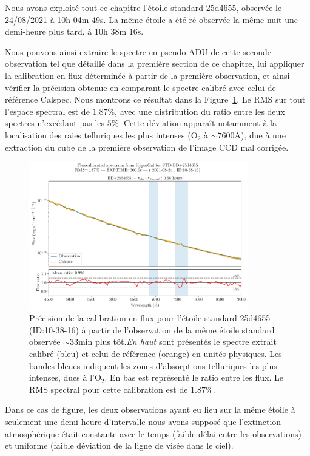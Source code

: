 \documentclass[../main/main.tex]{subfiles}
\begin{document}
Nous avons exploité tout ce chapitre l'étoile standard 25d4655, observée
le 24/08/2021 à 10h 04m 49s. La même étoile a été ré-observée la même
nuit une demi-heure plus tard, à 10h 38m 16s.

Nous pouvons ainsi extraire le spectre en pseudo-ADU de cette seconde
observation tel que détaillé dans la première section de ce chapitre,
lui appliquer la calibration en flux déterminée à partir de la première
observation, et ainsi vérifier la précision obtenue en comparant le
spectre calibré avec celui de référence Calspec.
Nous montrons ce résultat dans la Figure~\ref{fig:fluxcalstd}.
Le RMS sur tout l'espace spectral est de $1.87\%$, avec une distribution
du ratio entre les deux spectres n'excédant pas les $5\%$. Cette
déviation apparaît notamment à la localisation des raies telluriques les
plus intenses (O$_{2}$ à $\sim7600$\AA), due à une extraction du cube de
la première observation de l'image CCD mal corrigée.

\begin{figure}[ht]
  \centering
  \includegraphics[width=0.85\textwidth]{../figures/06_irf/fluxcalstd.pdf}
  \caption[Précision de la calibration en flux pour une étoile
  standard.]{Précision de la calibration en flux pour l'étoile standard
    25d4655 (ID:10-38-16) à partir de l'observation de la même étoile standard
    observée $\sim33$min plus tôt.\emph{En haut} sont présentés le
    spectre extrait calibré (bleu) et celui de référence (orange) en
    unités physiques. Les bandes bleues indiquent les zones
    d'absorptions telluriques les plus intenses, dues à l'O$_{2}$. En
    bas est représenté le ratio entre les flux. Le RMS spectral pour
    cette calibration est de $1.87\%$.}
  \label{fig:fluxcalstd}
\end{figure}


Dans ce cas de figure, les deux observations ayant eu lieu sur la même
étoile à seulement une demi-heure d'intervalle nous avons supposé que
l'extinction atmosphérique était constante avec le temps (faible délai
entre les observations) et uniforme (faible déviation de la ligne de
visée dans le ciel).
\end{document}
